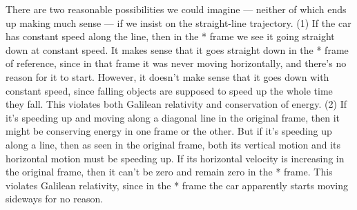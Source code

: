 There are two reasonable possibilities we could imagine --- neither
of which ends up making much sense --- if we insist on the
straight-line trajectory. (1) If the car has constant speed along the
line, then in the * frame we see it going straight down at constant
speed. It makes sense that it goes straight down in the * frame of
reference, since in that frame it was never moving horizontally, and
there's no reason for it to start. However, it doesn't make sense
that it goes down with constant speed, since falling objects are
supposed to speed up the whole time they fall. This violates both
Galilean relativity and conservation of energy. (2) If it's speeding
up and moving along a diagonal line in the original frame, then it
might be conserving energy in one frame or the other. But if it's
speeding up along a line, then as seen in the original frame, both
its vertical motion and its horizontal motion must be speeding up. If
its horizontal velocity is increasing in the original frame, then it
can't be zero and remain zero in the * frame. This violates Galilean
relativity, since in the * frame the car apparently starts moving
sideways for no reason.
